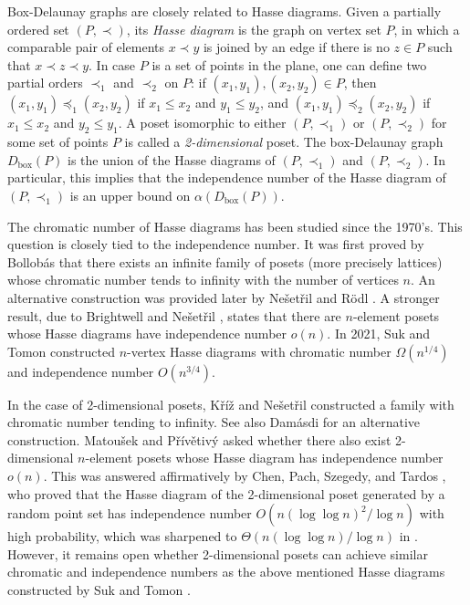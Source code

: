 \documentclass[11pt]{article}
\theoremstyle{definition}
\DeclareMathOperator{\bx}{box}
\begin{document}
Box-Delaunay graphs are closely related to Hasse diagrams. Given a partially ordered set $(P,\prec)$, its \emph{Hasse diagram} is the graph on vertex set $P$, in which a comparable pair of elements $x\prec y$ is joined by an edge if there is no $z\in P$ such that $x\prec z\prec y$. In case $P$ is a set of points in the plane, one can define two partial orders $\prec_1$ and $\prec_2$ on $P$: if $(x_1,y_1),(x_2,y_2)\in P$, then $(x_1,y_1)\preceq_1 (x_2,y_2)$ if $x_1\leq x_2$ and $y_1\leq y_2$, and $(x_1,y_1)\preceq_2 (x_2,y_2)$ if $x_1\leq x_2$ and $y_2\leq y_1$. A poset isomorphic to either $(P,\prec_1)$ or $(P,\prec_2)$ for some set of points $P$ is called a \emph{2-dimensional} poset. The box-Delaunay graph $D_{\bx}(P)$ is the union of the Hasse diagrams of $(P,\prec_1)$ and $(P,\prec_2)$. In particular, this implies that the independence number of the Hasse diagram of $(P,\prec_1)$ is an upper bound on $\alpha(D_{\bx}(P))$. 

The chromatic number of Hasse diagrams has been studied since the 1970's. This question is closely tied to the independence number. It was first proved by Bollob\'as  \cite{Bollobas} that there exists an infinite family of posets (more precisely lattices) whose chromatic number tends to infinity with the number of vertices $n$. An alternative construction was provided later by Ne\v{s}et\v{r}il and R\"odl \cite{NR}. A stronger result, due to Brightwell and Ne\v{s}et\v{r}il \cite{BN}, states that there are $n$-element posets whose Hasse diagrams have independence number $o(n)$. In 2021, Suk and Tomon \cite{SukTom21} constructed $n$-vertex Hasse diagrams with chromatic number $\Omega(n^{1/4})$ and independence number $O(n^{3/4})$.

In the case of 2-dimensional posets,  K\v{r}\'i\v{z} and Ne\v{s}et\v{r}il \cite{KN} constructed a family with chromatic number tending to infinity. See also Dam\'asdi \cite{Damasdi} for an alternative construction. Matou\v{s}ek and P\v{r}\'iv\v{e}tiv\'y \cite{MP} asked whether there also exist 2-dimensional $n$-element posets whose Hasse diagram has independence number $o(n)$. This was answered affirmatively by Chen, Pach, Szegedy, and Tardos \cite{CPST}, who proved that the Hasse diagram of the 2-dimensional poset generated by a random point set has independence number $O(n(\log \log n)^2/\log n)$ with high probability, which was sharpened to $\Theta(n(\log \log n)/\log n)$ in \cite{JKL}. However, it remains open whether 2-dimensional posets can achieve similar chromatic and independence numbers as the above mentioned Hasse diagrams constructed by Suk and Tomon \cite{SukTom21}. 
\end{document}

